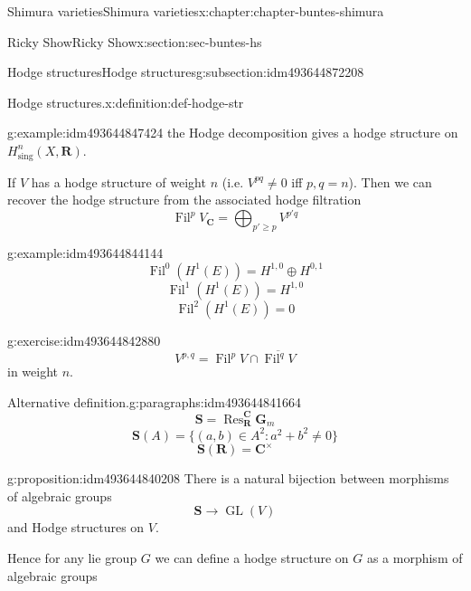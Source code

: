 \documentclass[oneside,10pt,]{book}
\numberwithin{equation}{section}
\newcommand{\RR}{\mathbf{R}}
\newcommand{\CC}{\mathbf{C}}
\DeclareMathOperator{\Fil}{Fil}
\DeclareMathOperator{\Res}{Res}
\DeclareMathOperator{\GL}{GL}
\begin{document}
\begin{chapterptx}{Shimura varieties}{}{Shimura varieties}{}{}{x:chapter:chapter-buntes-shimura}
\begin{sectionptx}{Ricky Show}{}{Ricky Show}{}{}{x:section:sec-buntes-hs}
\begin{subsectionptx}{Hodge structures}{}{Hodge structures}{}{}{g:subsection:idm493644872208}
\begin{definition}{Hodge structures.}{x:definition:def-hodge-str}
\end{definition}
\begin{example}{}{g:example:idm493644847424}%
the Hodge decomposition gives a hodge structure on \(H^n_{\mathrm{sing}}(X, \RR)\).%
\end{example}
If \(V\) has a hodge structure of weight \(n\) (i.e. \(V^{pq} \ne 0\) iff \(p,q = n\)). Then we can recover the hodge structure from the associated hodge filtration%
\begin{equation*}
\Fil^p V_\CC = \bigoplus_{p' \ge p} V^{p' q}
\end{equation*}
%
\begin{example}{}{g:example:idm493644844144}%
%
\begin{equation*}
\Fil^0(H^1(E)) = H^{1,0} \oplus H^{0,1}
\end{equation*}
%
\begin{equation*}
\Fil^1(H^1(E)) = H^{1,0}
\end{equation*}
%
\begin{equation*}
\Fil^2(H^1(E)) = 0
\end{equation*}
%
\end{example}
\begin{inlineexercise}{}{g:exercise:idm493644842880}%
%
\begin{equation*}
V^{p,q} = \Fil^p V \cap \overline {\Fil^q V}
\end{equation*}
in weight \(n\).%
\end{inlineexercise}
\begin{paragraphs}{Alternative definition.}{g:paragraphs:idm493644841664}%
%
\begin{equation*}
\mathbf S = \Res_\RR^\CC \mathbf G_m
\end{equation*}
%
\begin{equation*}
\mathbf S(A) = \{ (a,b) \in A^2 : a^2+  b^2 \ne 0\}
\end{equation*}
%
\begin{equation*}
\mathbf S(\RR) = \CC^\times
\end{equation*}
%
\begin{proposition}{}{}{g:proposition:idm493644840208}%
There is  a natural bijection between morphisms of algebraic groups%
\begin{equation*}
\mathbf S \to \GL(V)
\end{equation*}
and Hodge structures on \(V\).%
\end{proposition}
Hence for any lie group \(G\) we can define a hodge structure on \(G\) as a morphism of algebraic groups%
\begin{equation*}

\end{equation*}
\end{paragraphs}
\end{subsectionptx}
\end{sectionptx}
\end{chapterptx}
\end{document}
